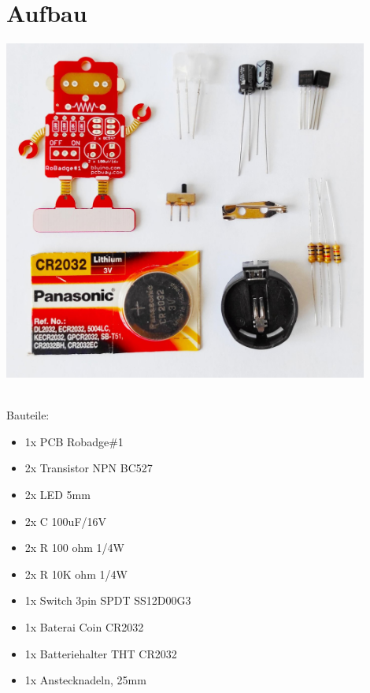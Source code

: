 \documentclass[a4paper]{article}
\begin{document}
\section{Aufbau}
\begin{minipage}[t]{\textwidth}
  \centering
  \includegraphics[width=0.9\textwidth]{../pictures/Partlist.jpg}
  \label{img:Bauteile}
\end{minipage}
\ \\
Bauteile:
\begin{itemize}
  \item     1x PCB Robadge\#1
  \item     2x Transistor NPN BC527
  \item     2x LED 5mm
  \item     2x C 100uF/16V
  \item     2x R 100 ohm 1/4W
  \item     2x R 10K ohm 1/4W
  \item     1x Switch 3pin SPDT SS12D00G3
  \item     1x Baterai Coin CR2032
  \item     1x Batteriehalter THT CR2032
  \item     1x Anstecknadeln, 25mm 
\end{itemize}
\end{document}
